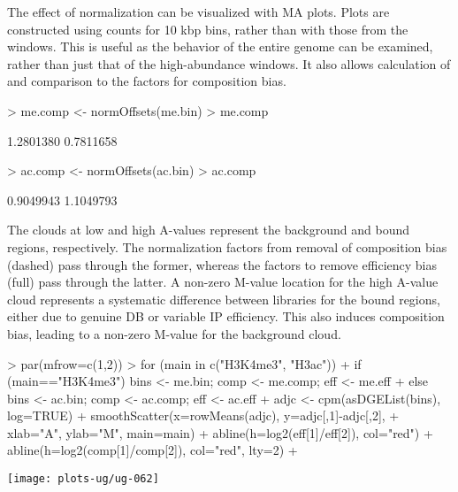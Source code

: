 \documentclass[12pt]{report}
\renewenvironment{Schunk}{\vspace{0pt}}{\vspace{0pt}}
\begin{document}
The effect of normalization can be visualized with MA plots. 
Plots are constructed using counts for 10 kbp bins, rather than with those from the windows.
This is useful as the behavior of the entire genome can be examined, rather than just that of the high-abundance windows.
It also allows calculation of and comparison to the factors for composition bias.

\begin{Schunk}
\begin{Sinput}
> me.comp <- normOffsets(me.bin)
> me.comp
\end{Sinput}
\begin{Soutput}
[1] 1.2801380 0.7811658
\end{Soutput}
\begin{Sinput}
> ac.comp <- normOffsets(ac.bin)
> ac.comp
\end{Sinput}
\begin{Soutput}
[1] 0.9049943 1.1049793
\end{Soutput}
\end{Schunk}

The clouds at low and high A-values represent the background and bound regions, respectively.
The normalization factors from removal of composition bias (dashed) pass through the former, whereas the factors to remove efficiency bias (full) pass through the latter.
A non-zero M-value location for the high A-value cloud represents a systematic difference between libraries for the bound regions, either due to genuine DB or variable IP efficiency. 
This also induces composition bias, leading to a non-zero M-value for the background cloud.

\begin{Schunk}
\begin{Sinput}
> par(mfrow=c(1,2))
> for (main in c("H3K4me3", "H3ac")) { 
+     if (main=="H3K4me3") { bins <- me.bin; comp <- me.comp; eff <- me.eff }
+     else { bins <- ac.bin; comp <- ac.comp; eff <- ac.eff }
+     adjc <- cpm(asDGEList(bins), log=TRUE)
+     smoothScatter(x=rowMeans(adjc), y=adjc[,1]-adjc[,2], 
+         xlab="A", ylab="M", main=main)
+     abline(h=log2(eff[1]/eff[2]), col="red")
+     abline(h=log2(comp[1]/comp[2]), col="red", lty=2)
+ }
\end{Sinput}
\end{Schunk}

\begin{center}
\texttt{[image: plots-ug/ug-062]}
\end{center}
\end{document}
